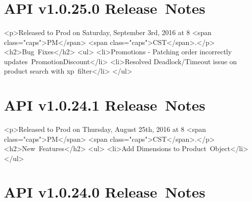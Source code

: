 \documentclass{memoir}%
\begin{document}
%
\section*{API v1.0.25.0 Release~Notes}%
\paragraph*{}%

%
\paragraph*{}%
<p>Released to Prod on Saturday, September 3rd, 2016 at 8 <span class="caps">PM</span> <span class="caps">CST</span>.</p>\newline%
<h2>Bug~Fixes</h2>\newline%
<ul>\newline%
<li>Promotions {-} Patching order incorrectly updates~PromotionDiscount</li>\newline%
<li>Resolved Deadlock/Timeout issue on product search with xp~filter</li>\newline%
</ul>

%
\section*{API v1.0.24.1 Release~Notes}%
\paragraph*{}%

%
\paragraph*{}%
<p>Released to Prod on Thursday, August 25th, 2016 at 8 <span class="caps">PM</span> <span class="caps">CST</span>.</p>\newline%
<h2>New~Features</h2>\newline%
<ul>\newline%
<li>Add Dimensions to Product~Object</li>\newline%
</ul>

%
\section*{API v1.0.24.0 Release~Notes}%
\paragraph*{}%
\end{document}
